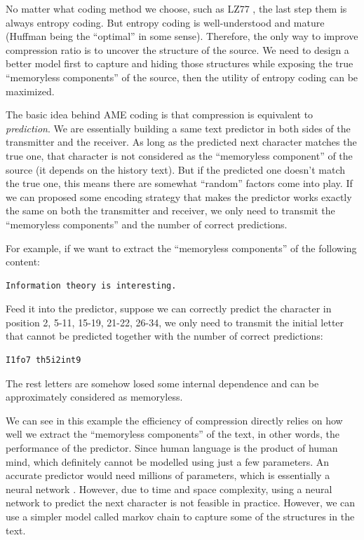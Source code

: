 \documentclass[12pt,twoside]{article}
\begin{document}
No matter what coding method we choose, such as LZ77 \cite{ref6, ref7}, the last step them is always entropy coding. But entropy coding is well-understood and mature (Huffman being the ``optimal'' in some sense). Therefore, the only way to improve compression ratio is to uncover the structure of the source. We need to design a better model first to capture and hiding those structures while exposing the true ``memoryless components'' of the source, then the utility of entropy coding can be maximized.

The basic idea behind AME coding is that compression is equivalent to \textit{prediction}. We are essentially building a same text predictor in both sides of the transmitter and the receiver. As long as the predicted next character matches the true one, that character is not considered as the ``memoryless component'' of the source (it depends on the history text). But if the predicted one doesn't match the true one, this means there are somewhat ``random'' factors come into play. If we can proposed some encoding strategy that makes the predictor works exactly the same on both the transmitter and receiver, we only need to transmit the ``memoryless components'' and the number of correct predictions. 

For example, if we want to extract the ``memoryless components'' of the following content:

\begin{lstlisting}[language=bash, style=custombash]
Information theory is interesting.
\end{lstlisting}

Feed it into the predictor, suppose we can correctly predict the character in position 2, 5-11, 15-19, 21-22, 26-34, we only need to transmit the initial letter that cannot be predicted together with the number of correct predictions:

\begin{lstlisting}[language=bash, style=custombash]
I1fo7 th5i2int9
\end{lstlisting}

The rest letters are somehow losed some internal dependence and can be approximately considered as memoryless. 

We can see in this example the efficiency of compression directly relies on how well we extract the ``memoryless components'' of the text, in other words, the performance of the predictor. Since human language is the product of human mind, which definitely cannot be modelled using just a few parameters. An accurate predictor would need millions of parameters, which is essentially a neural network \cite{ref5}. However, due to time and space complexity, using a neural network to predict the next character is not feasible in practice. However, we can use a simpler model called markov chain to capture some of the structures in the text.
\end{document}
